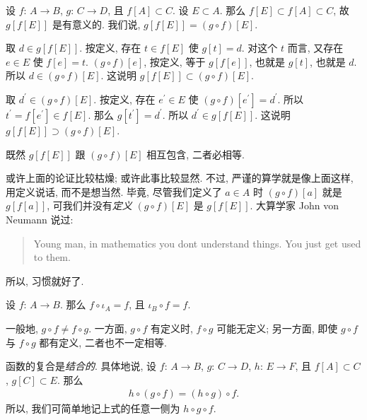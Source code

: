 \begin{remark}
    设 $f$: $A \to B$, $g$: $C \to D$, 且 $f[A] \subset C$. 设 $E \subset A$. 那么 $f[E] \subset f[A] \subset C$, 故 $g[f[E]]$ 是有意义的. 我们说, $g[f[E]] = (g \circ f)[E]$.

    取 $d \in g[f[E]]$. 按定义, 存在 $t \in f[E]$ 使 $g[t] = d$. 对这个 $t$ 而言, 又存在 $e \in E$ 使 $f[e] = t$. $(g \circ f)[e]$, 按定义, 等于 $g[f[e]]$, 也就是 $g[t]$, 也就是 $d$. 所以 $d \in (g \circ f)[E]$. 这说明 $g[f[E]] \subset (g \circ f)[E]$.

    取 $d^{\prime} \in (g \circ f)[E]$. 按定义, 存在 $e^{\prime} \in E$ 使 $(g \circ f)[e^{\prime}] = d^{\prime}$. 所以 $t^{\prime} = f[e^{\prime}] \in f[E]$. 那么 $g[t^{\prime}] = d^{\prime}$. 所以 $d^{\prime} \in g[f[E]]$. 这说明 $g[f[E]] \supset (g \circ f)[E]$.

    既然 $g[f[E]]$ 跟 $(g \circ f)[E]$ 相互包含, 二者必相等.

    或许上面的论证比较枯燥; 或许此事比较显然. 不过, 严谨的算学就是像上面这样, 用定义说话, 而不是想当然. 毕竟, 尽管我们定义了 $a \in A$ 时 $(g \circ f)[a]$ 就是 $g[f[a]]$, 可我们并没有\emph{定义} $(g \circ f)[E]$ 是 $g[f[E]]$. 大算学家 John von Neumann 说过:
    \begin{quotation}
        Young man, in mathematics you don{\textquotesingle}t understand things. You just get used to them.
    \end{quotation}
    所以, 习惯就好了.
\end{remark}

\begin{remark}
    设 $f$: $A \to B$. 那么 $f \circ \iota_A = f$, 且 $\iota_B \circ f = f$.
\end{remark}

\begin{remark}
    一般地, $g \circ f \neq f \circ g$. 一方面, $g \circ f$ 有定义时, $f \circ g$ 可能无定义; 另一方面, 即使 $g \circ f$ 与 $f \circ g$ 都有定义, 二者也不一定相等.
\end{remark}

\begin{theorem}
    函数的复合是\emph{结合的}. 具体地说, 设 $f$: $A \to B$, $g$: $C \to D$, $h$: $E \to F$, 且 $f[A] \subset C$, $g[C] \subset E$. 那么
    \begin{align*}
        h \circ (g \circ f) = (h \circ g) \circ f.
    \end{align*}
    所以, 我们可简单地记上式的任意一侧为 $h \circ g \circ f$.
\end{theorem}

